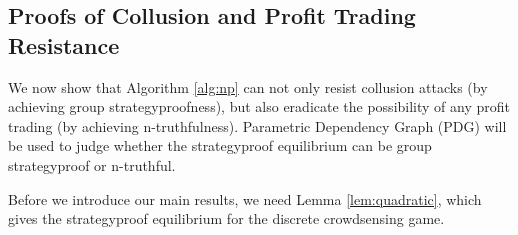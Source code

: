 \documentclass[conference]{IEEEtran}
\theoremstyle{definition}
\begin{document}
{\color{black}
\subsection{Proofs of Collusion and Profit Trading Resistance}
We now show that Algorithm \ref{alg:np} can not only resist collusion attacks (by achieving group strategyproofness), but also eradicate the possibility of any profit trading (by achieving n-truthfulness). Parametric Dependency Graph (PDG) will be used to judge whether the strategyproof equilibrium can be group strategyproof or n-truthful.

{\color{blue} Before we introduce our main results, we need Lemma \ref{lem:quadratic}, which gives the strategyproof equilibrium for the discrete crowdsensing game. }
\begin{figure}[!t]
\centering{}
\setlength{\unitlength}{1cm}
%
\end{figure}}
\end{document}
